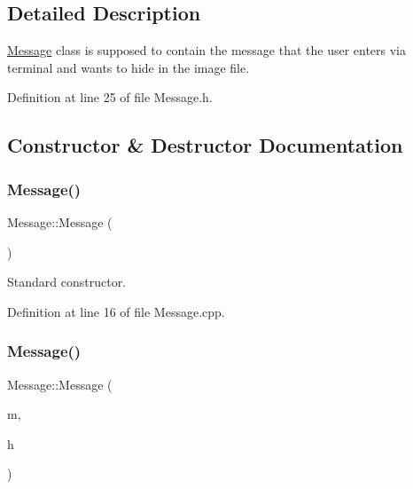 \subsection{Detailed Description}
\mbox{\hyperlink{classMessage}{Message}} class is supposed to contain the message that the user enters via terminal and wants to hide in the image file. 

Definition at line 25 of file Message.\+h.



\subsection{Constructor \& Destructor Documentation}
\mbox{\label{classMessage_a4fc4f717b634e66070366cb7722d7761}} 
\subsubsection{\texorpdfstring{Message()}{Message()}\hspace{0.1cm}{\footnotesize\ttfamily [1/3]}}
{\footnotesize\ttfamily Message\+::\+Message (\begin{DoxyParamCaption}{ }\end{DoxyParamCaption})}



Standard constructor. 



Definition at line 16 of file Message.\+cpp.

\mbox{\label{classMessage_a77d26df352bf5aaaba85ccf940238257}} 
\subsubsection{\texorpdfstring{Message()}{Message()}\hspace{0.1cm}{\footnotesize\ttfamily [2/3]}}
{\footnotesize\ttfamily Message\+::\+Message (\begin{DoxyParamCaption}\item[{std\+::string}]{m,  }\item[{\mbox{\hyperlink{classErrorHandler}{Error\+Handler}} $\ast$}]{h }\end{DoxyParamCaption})}



